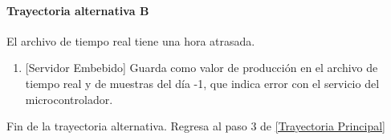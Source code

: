 \paragraph{Trayectoria alternativa B} \label{SUB-M-CU1.5:TB}
	El archivo de tiempo real tiene una hora atrasada.
	\begin{enumerate}[label=B\arabic*.]
		\item {[Servidor Embebido]} Guarda como valor de producción en el archivo de tiempo real y de muestras del día -1, que indica error con el servicio del microcontrolador.  
	\end{enumerate}
	Fin de la trayectoria alternativa. Regresa al paso 3 de \hyperref[SUB-M-CU1.5:TP]{[Trayectoria Principal]}  
